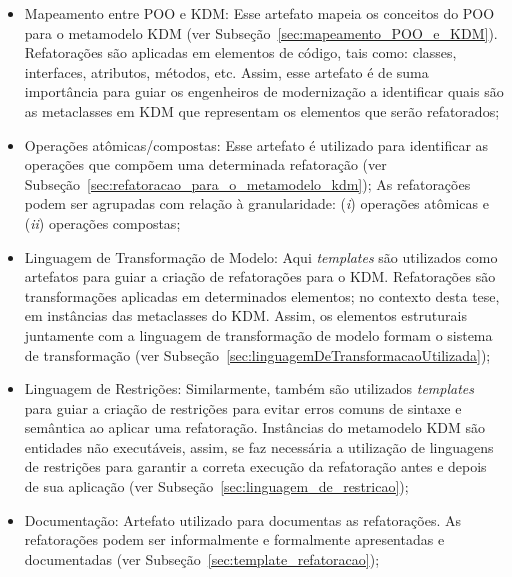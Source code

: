 \begin{itemize}
\item Mapeamento entre POO e KDM: Esse artefato mapeia os conceitos do POO para o metamodelo KDM (ver Subseção~\ref{sec:mapeamento_POO_e_KDM}). Refatorações são aplicadas em elementos de código, tais como: classes, interfaces, atributos, métodos, etc. Assim, esse artefato é de suma importância para guiar os engenheiros de modernização a identificar quais são as metaclasses em KDM que representam os elementos que serão refatorados;

\item Operações atômicas/compostas: Esse artefato é utilizado para identificar as operações que compõem uma determinada refatoração (ver Subseção~\ref{sec:refatoracao_para_o_metamodelo_kdm}); As refatorações podem ser agrupadas com relação à granularidade: (\textit{i}) operações atômicas e (\textit{ii}) operações compostas;

\item Linguagem de Transformação de Modelo: Aqui \textit{templates} são utilizados como artefatos para guiar a criação de refatorações para o KDM. Refatorações são transformações aplicadas em determinados elementos; no contexto desta tese, em instâncias das metaclasses do KDM. Assim, os elementos estruturais juntamente com a linguagem de transformação de modelo formam o sistema de transformação (ver Subseção~\ref{sec:linguagemDeTransformacaoUtilizada});

\item Linguagem de Restrições: Similarmente, também são utilizados \textit{templates} para guiar a criação de restrições para evitar erros comuns de sintaxe e semântica ao aplicar uma refatoração. Instâncias do metamodelo KDM são entidades não executáveis, assim, se faz necessária a utilização de linguagens de restrições para garantir a correta execução da refatoração antes e depois de sua aplicação (ver Subseção~\ref{sec:linguagem_de_restricao});

\item Documentação: Artefato utilizado para documentas as refatorações. As refatorações podem ser informalmente e formalmente apresentadas e documentadas (ver Subseção~\ref{sec:template_refatoracao});


\end{itemize}

